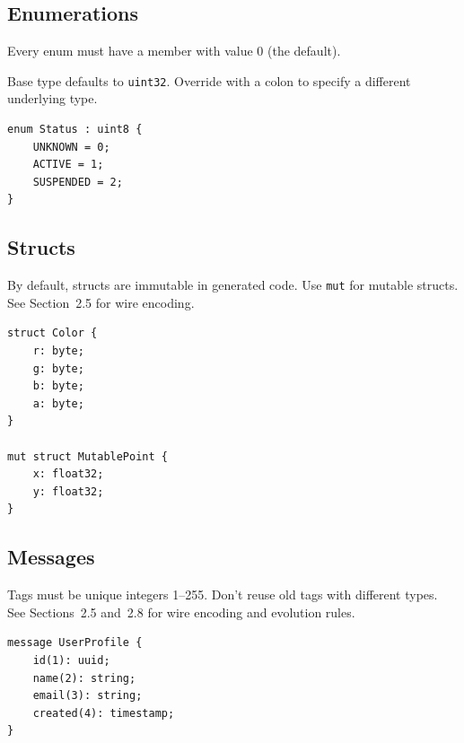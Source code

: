 \documentclass[11pt,onecolumn]{article}
\begin{document}
\subsection{Enumerations}

\begin{minipage}{\textwidth}
\begin{minipage}[t]{0.52\textwidth}
\raggedright
Every enum must have a member with value 0 (the default).

\vspace{6pt}
Base type defaults to \texttt{uint32}. Override with a colon to specify a different underlying type.
\end{minipage}\hfill
\begin{minipage}[t]{0.44\textwidth}
\begin{lstlisting}[language=bebop,aboveskip=0pt,belowskip=0pt]
enum Status : uint8 {
    UNKNOWN = 0;
    ACTIVE = 1;
    SUSPENDED = 2;
}
\end{lstlisting}
\end{minipage}
\end{minipage}


\subsection{Structs}

\begin{minipage}[t]{0.52\textwidth}
By default, structs are immutable in generated code. Use \texttt{mut} for mutable structs. See Section~2.5 for wire encoding.
\end{minipage}\hfill
\begin{minipage}[t]{0.44\textwidth}
\begin{lstlisting}[language=bebop,aboveskip=0pt,belowskip=0pt]
struct Color {
    r: byte;
    g: byte;
    b: byte;
    a: byte;
}

mut struct MutablePoint {
    x: float32;
    y: float32;
}
\end{lstlisting}
\end{minipage}


\subsection{Messages}

\begin{minipage}[t]{0.52\textwidth}
Tags must be unique integers 1--255. Don't reuse old tags with different types. See Sections~2.5 and~2.8 for wire encoding and evolution rules.
\end{minipage}\hfill
\begin{minipage}[t]{0.44\textwidth}
\begin{lstlisting}[language=bebop,aboveskip=0pt,belowskip=0pt]
message UserProfile {
    id(1): uuid;
    name(2): string;
    email(3): string;
    created(4): timestamp;
}
\end{lstlisting}
\end{minipage}
\end{document}
